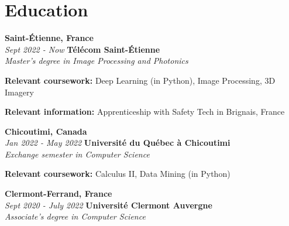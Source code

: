     
    \section{Education}
       \begin{twocolentry}{
            \textbf{Saint-Étienne, France}\\
            \textit{Sept 2022 - Now}
            }{
            \textbf{Télécom Saint-Étienne}\\
            \textit{Master's degree in Image Processing and Photonics}%
            }
        \end{twocolentry}


        \begin{onecolentry}
            \begin{highlights}
                \item \textbf{Relevant coursework:} Deep Learning (in Python), Image Processing, 3D Imagery
                \item \textbf{Relevant information:} Apprenticeship with Safety Tech in Brignais, France
            \end{highlights}
        \end{onecolentry}

		\begin{twocolentry}{
			\textbf{Chicoutimi, Canada} \\
			\textit{Jan 2022 - May 2022}
            }{
            \textbf{Université du Québec à Chicoutimi} \\
            \textit{Exchange semester in Computer Science}
            }
        \end{twocolentry}

        \begin{onecolentry}
            \begin{highlights}
                \item \textbf{Relevant coursework:} Calculus II, Data Mining (in Python)
            \end{highlights}
        \end{onecolentry}

		\begin{twocolentry}{
			\textbf{Clermont-Ferrand, France} \\
			\textit{Sept 2020 - July 2022}
            }{
            \textbf{Université Clermont Auvergne} \\
            \textit{Associate's degree in Computer Science}
            }
        \end{twocolentry}

